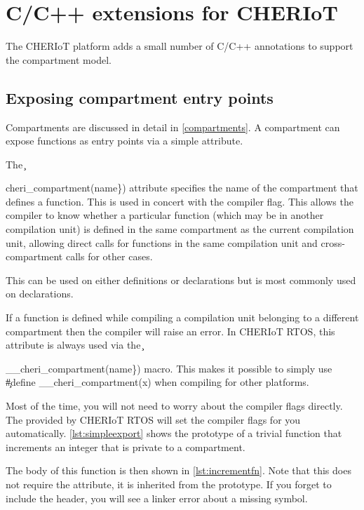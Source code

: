 \chapter[label=language_extensions]{C/C++ extensions for CHERIoT}

The CHERIoT platform adds a small number of C/C++ annotations to support the compartment model.

\section[label=exporting_functions]{Exposing compartment entry points}

Compartments are discussed in detail in \ref{compartments}.
A compartment can expose functions as entry points via a simple attribute.

The \c{cheri_compartment({name\})} attribute specifies the name of the compartment that defines a function.
This is used in concert with the  compiler flag.
This allows the compiler to know whether a particular function (which may be in another compilation unit) is defined in the same compartment as the current compilation unit, allowing direct calls for functions in the same compilation unit and cross-compartment calls for other cases.

This can be used on either definitions or declarations but is most commonly used on declarations.

If a function is defined while compiling a compilation unit belonging to a different compartment then the compiler will raise an error.
In CHERIoT RTOS, this attribute is always used via the \c{__cheri_compartment({name\})} macro.
This makes it possible to simply use \c{#define __cheri_compartment(x)} when compiling for other platforms.

Most of the time, you will not need to worry about the compiler flags directly.
The  provided by CHERIoT RTOS will set the compiler flags for you automatically.
\ref{lst:simpleexport} shows the prototype of a trivial function that increments an integer that is private to a compartment.

\codelisting[filename=examples/compartment_annotation/interface.h,marker=compartment_export,label=lst:simpleexport,caption="Exporting a function for use by other compartments from a header."]{}

The body of this function is then shown in \ref{lst:incrementfn}.
Note that this does not require the attribute, it is inherited from the prototype.
If you forget to include the header, you will see a linker error about a missing symbol.

}}
